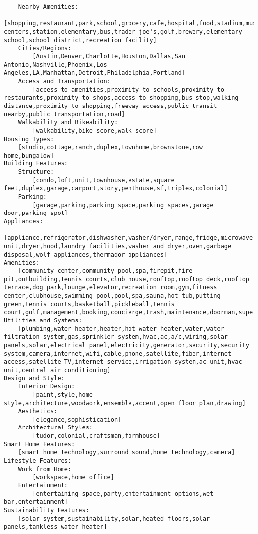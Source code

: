 \begin{lstlisting}
    Nearby Amenities:
        [shopping,restaurant,park,school,grocery,cafe,hospital,food,stadium,museum,boutique,shopping centers,station,elementary,bus,trader joe's,golf,brewery,elementary school,school district,recreation facility]
    Cities/Regions:
        [Austin,Denver,Charlotte,Houston,Dallas,San Antonio,Nashville,Phoenix,Los Angeles,LA,Manhattan,Detroit,Philadelphia,Portland]
    Access and Transportation:
        [access to amenities,proximity to schools,proximity to restaurants,proximity to shops,access to shopping,bus stop,walking distance,proximity to shopping,freeway access,public transit nearby,public transportation,road]
    Walkability and Bikeability:
        [walkability,bike score,walk score]
Housing Types:
    [studio,cottage,ranch,duplex,townhome,brownstone,row home,bungalow]
Building Features:
    Structure:
        [condo,loft,unit,townhouse,estate,square feet,duplex,garage,carport,story,penthouse,sf,triplex,colonial]
    Parking:
        [garage,parking,parking space,parking spaces,garage door,parking spot]
Appliances:
    [appliance,refrigerator,dishwasher,washer/dryer,range,fridge,microwave,washer,ac unit,dryer,hood,laundry facilities,washer and dryer,oven,garbage disposal,wolf appliances,thermador appliances]
Amenities:
    [community center,community pool,spa,firepit,fire pit,outbuilding,tennis courts,club house,rooftop,rooftop deck,rooftop terrace,dog park,lounge,elevator,recreation room,gym,fitness center,clubhouse,swimming pool,pool,spa,sauna,hot tub,putting green,tennis courts,basketball,pickleball,tennis court,golf,management,booking,concierge,trash,maintenance,doorman,superintendent,nightlife,brewery]
Utilities and Systems:
    [plumbing,water heater,heater,hot water heater,water,water filtration system,gas,sprinkler system,hvac,ac,a/c,wiring,solar panels,solar,electrical panel,electricity,generator,security,security system,camera,internet,wifi,cable,phone,satellite,fiber,internet access,satellite TV,internet service,irrigation system,ac unit,hvac unit,central air conditioning]
Design and Style:
    Interior Design:
        [paint,style,home style,architecture,woodwork,ensemble,accent,open floor plan,drawing]
    Aesthetics:
        [elegance,sophistication]
    Architectural Styles:
        [tudor,colonial,craftsman,farmhouse]
Smart Home Features:
    [smart home technology,surround sound,home technology,camera]
Lifestyle Features:
    Work from Home:
        [workspace,home office]
    Entertainment:
        [entertaining space,party,entertainment options,wet bar,entertainment]
Sustainability Features:
    [solar system,sustainability,solar,heated floors,solar panels,tankless water heater]

\end{lstlisting}
